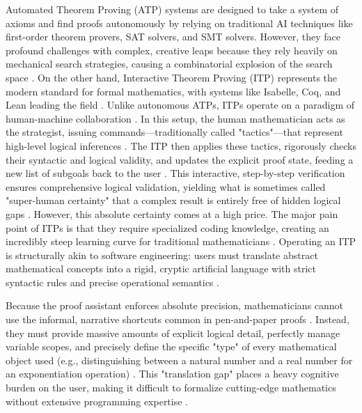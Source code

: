 Automated Theorem Proving (ATP) systems are designed to take a system of axioms and find proofs autonomously \cite{pantsar_theorem_2024} by relying on traditional AI techniques like first-order theorem provers, SAT solvers, and SMT solvers. However, they face profound challenges with complex, creative leaps because they rely heavily on mechanical search strategies, causing a combinatorial explosion of the search space \cite{avigad_mathematics_2024}. On the other hand, Interactive Theorem Proving (ITP) represents the modern standard for formal mathematics, with systems like Isabelle, Coq, and Lean leading the field \cite{doan_ai-assisted_2025, asperti_thinking_2026}. Unlike autonomous ATPs, ITPs operate on a paradigm of human-machine collaboration \cite{asperti_thinking_2026, pantsar_theorem_2024}. In this setup, the human mathematician acts as the strategist, issuing commands—traditionally called "tactics"—that represent high-level logical inferences \cite{asperti_thinking_2026}. The ITP then applies these tactics, rigorously checks their syntactic and logical validity, and updates the explicit proof state, feeding a new list of subgoals back to the user \cite{asperti_thinking_2026}. This interactive, step-by-step verification ensures comprehensive logical validation, yielding what is sometimes called "super-human certainty" that a complex result is entirely free of hidden logical gaps \cite{asperti_thinking_2026, de_toffoli_proofs_2024}. However, this absolute certainty comes at a high price. The major pain point of ITPs is that they require specialized coding knowledge, creating an incredibly steep learning curve for traditional mathematicians \cite{asperti_thinking_2026, patel_leantutor_2025}. Operating an ITP is structurally akin to software engineering: users must translate abstract mathematical concepts into a rigid, cryptic artificial language with strict syntactic rules and precise operational semantics \cite{asperti_thinking_2026, doan_ai-assisted_2025}.

Because the proof assistant enforces absolute precision, mathematicians cannot use the informal, narrative shortcuts common in pen-and-paper proofs \cite{asperti_thinking_2026}. Instead, they must provide massive amounts of explicit logical detail, perfectly manage variable scopes, and precisely define the specific "type" of every mathematical object used (e.g., distinguishing between a natural number and a real number for an exponentiation operation) \cite{asperti_thinking_2026, tao_machine-assisted_2025}. This "translation gap" places a heavy cognitive burden on the user, making it difficult to formalize cutting-edge mathematics without extensive programming expertise \cite{asperti_thinking_2026, avigad_mathematics_2024}.

